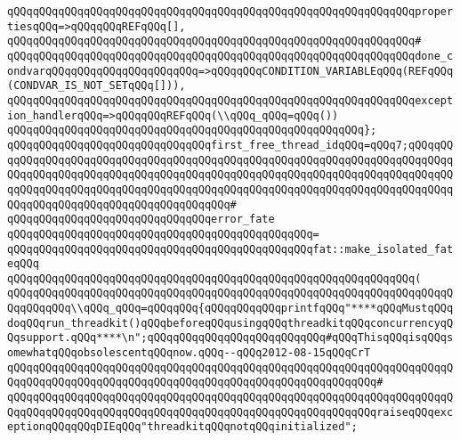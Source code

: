 \verb|qQQqqQQqqQQqqQQqqQQqqQQqqQQqqQQqqQQqqQQqqQQqqQQqqQQqqQQqqQQqqQQqpropertiesqQQq=>qQQqqQQqREFqQQq[],|\newline
\verb|qQQqqQQqqQQqqQQqqQQqqQQqqQQqqQQqqQQqqQQqqQQqqQQqqQQqqQQqqQQqqQQq#|\newline
\verb|qQQqqQQqqQQqqQQqqQQqqQQqqQQqqQQqqQQqqQQqqQQqqQQqqQQqqQQqqQQqqQQqdone_condvarqQQqqQQqqQQqqQQqqQQqqQQq=>qQQqqQQqCONDITION_VARIABLEqQQq(REFqQQq(CONDVAR_IS_NOT_SETqQQq[])),|\newline
\verb|qQQqqQQqqQQqqQQqqQQqqQQqqQQqqQQqqQQqqQQqqQQqqQQqqQQqqQQqqQQqqQQqexception_handlerqQQq=>qQQqqQQqREFqQQq(\\qQQq_qQQq=qQQq())|\newline
\verb|qQQqqQQqqQQqqQQqqQQqqQQqqQQqqQQqqQQqqQQqqQQqqQQqqQQqqQQq};|\newline
\newline
\verb|qQQqqQQqqQQqqQQqqQQqqQQqqQQqqQQqfirst_free_thread_idqQQq=qQQq7;qQQqqQQqqQQqqQQqqQQqqQQqqQQqqQQqqQQqqQQqqQQqqQQqqQQqqQQqqQQqqQQqqQQqqQQqqQQqqQQqqQQqqQQqqQQqqQQqqQQqqQQqqQQqqQQqqQQqqQQqqQQqqQQqqQQqqQQqqQQqqQQqqQQqqQQqqQQqqQQqqQQqqQQqqQQqqQQqqQQqqQQqqQQqqQQqqQQqqQQqqQQqqQQqqQQqqQQqqQQqqQQqqQQqqQQqqQQqqQQqqQQqqQQqqQQq#|\newline
\newline
\verb|qQQqqQQqqQQqqQQqqQQqqQQqqQQqqQQqerror_fate|\newline
\verb|qQQqqQQqqQQqqQQqqQQqqQQqqQQqqQQqqQQqqQQqqQQqqQQq=|\newline
\verb|qQQqqQQqqQQqqQQqqQQqqQQqqQQqqQQqqQQqqQQqqQQqqQQqfat::make_isolated_fateqQQq|\newline
\verb|qQQqqQQqqQQqqQQqqQQqqQQqqQQqqQQqqQQqqQQqqQQqqQQqqQQqqQQqqQQqqQQq(|\newline
\verb|qQQqqQQqqQQqqQQqqQQqqQQqqQQqqQQqqQQqqQQqqQQqqQQqqQQqqQQqqQQqqQQqqQQqqQQqqQQqqQQq\\qQQq_qQQq=qQQqqQQq{qQQqqQQqqQQqprintfqQQq"****qQQqMustqQQqdoqQQqrun_threadkit()qQQqbeforeqQQqusingqQQqthreadkitqQQqconcurrencyqQQqsupport.qQQq****\n";qQQqqQQqqQQqqQQqqQQqqQQqqQQq#qQQqThisqQQqisqQQqsomewhatqQQqobsolescentqQQqnow.qQQq--qQQq2012-08-15qQQqCrT|\newline
\verb|qQQqqQQqqQQqqQQqqQQqqQQqqQQqqQQqqQQqqQQqqQQqqQQqqQQqqQQqqQQqqQQqqQQqqQQqqQQqqQQqqQQqqQQqqQQqqQQqqQQqqQQqqQQqqQQqqQQqqQQqqQQqqQQq#|\newline
\verb|qQQqqQQqqQQqqQQqqQQqqQQqqQQqqQQqqQQqqQQqqQQqqQQqqQQqqQQqqQQqqQQqqQQqqQQqqQQqqQQqqQQqqQQqqQQqqQQqqQQqqQQqqQQqqQQqqQQqqQQqqQQqqQQqraiseqQQqexceptionqQQqqQQqDIEqQQq"threadkitqQQqnotqQQqinitialized";|\newline
